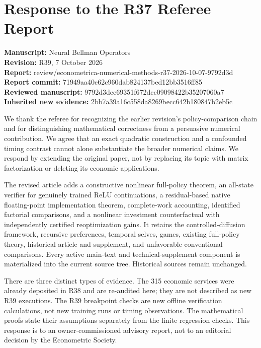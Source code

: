 \documentclass[
  11pt,
]{article}
\author{}
\date{}
\begin{document}
\hypertarget{response-to-the-r37-referee-report}{%
\section{Response to the R37 Referee
Report}\label{response-to-the-r37-referee-report}}

\textbf{Manuscript:} Neural Bellman Operators\\
\textbf{Revision:} R39, 7 October 2026\\
\textbf{Report:}
review/econometrica-numerical-methods-r37-2026-10-07-9792d3d\\
\textbf{Report commit:} 71949aa40c62c960dab824137bed12bb3516ff85\\
\textbf{Reviewed manuscript:} 9792d3dee69351f672dcc09098422b35207060a7\\
\textbf{Inherited new evidence:}
2bb7a39a16c558da8269becc642b180847b2eb5c

We thank the referee for recognizing the earlier revision's
policy-comparison chain and for distinguishing mathematical correctness
from a persuasive numerical contribution. We agree that an exact
quadratic construction and a confounded timing contrast cannot alone
substantiate the broader numerical claims. We respond by extending the
original paper, not by replacing its topic with matrix factorization or
deleting its economic applications.

The revised article adds a constructive nonlinear full-policy theorem,
an all-state verifier for genuinely trained ReLU continuations, a
residual-based native floating-point implementation theorem,
complete-work accounting, identified factorial comparisons, and a
nonlinear investment counterfactual with independently certified
reoptimization gains. It retains the controlled-diffusion framework,
recursive preferences, temporal selves, games, existing full-policy
theory, historical article and supplement, and unfavorable conventional
comparisons. Every active main-text and technical-supplement component
is materialized into the current source tree. Historical sources remain
unchanged.

There are three distinct types of evidence. The 315 economic services
were already deposited in R38 and are re-audited here; they are not
described as new R39 executions. The R39 breakpoint checks are new
offline verification calculations, not new training runs or timing
observations. The mathematical proofs state their assumptions separately
from the finite regression checks. This response is to an
owner-commissioned advisory report, not to an editorial decision by the
Econometric Society.
\end{document}
